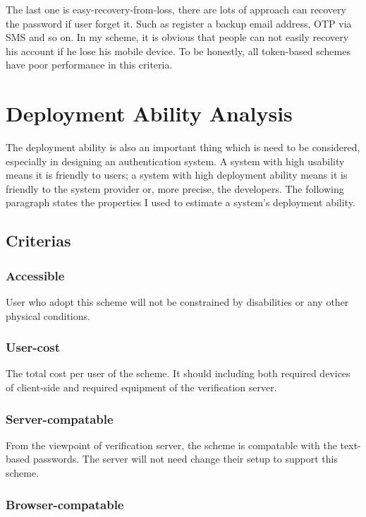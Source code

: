 \begin{CJK}{Bg5}{bsmi}
The last one is easy-recovery-from-loss, there are lots of approach can recovery the password if user forget it. Such as register a backup email address, OTP via SMS and so on. In my scheme, it is obvious that people can not easily recovery his account if he lose his mobile device. To be honestly, all token-based schemes have poor performance in this criteria.

\section{Deployment Ability Analysis}

The deployment ability is also an important thing which is need to be considered, especially in designing an authentication system. A system with high usability means it is friendly to users; a system with high deployment ability means it is friendly to the system provider or, more precise, the developers. The following paragraph states the properties I used to estimate a system's deployment ability.

\subsection{Criterias}

\subsubsection{Accessible}

User who adopt this scheme will not be constrained by disabilities or any other physical conditions.

\subsubsection{User-cost}

The total cost per user of the scheme. It should including both required devices of client-side and required equipment of the verification server.

\subsubsection{Server-compatable}

From the viewpoint of verification server, the scheme is compatable with the text-based passwords. The server will not need change their setup to support this scheme. 

\subsubsection{Browser-compatable}


\end{CJK}
